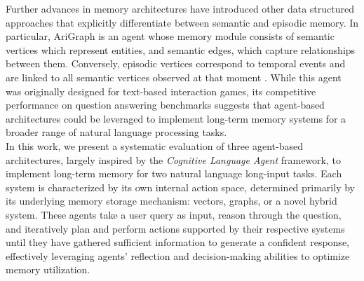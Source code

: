 \noindent Further advances in memory architectures have introduced other data structured approaches that explicitly differentiate between semantic and episodic memory. In particular, AriGraph is an agent whose memory module consists of semantic vertices which represent entities, and semantic edges, which capture relationships between them. Conversely, episodic vertices correspond to temporal events and are linked to all semantic vertices observed at that moment \cite{anokhin2024arigraphlearningknowledgegraph}. While this agent was originally designed for text-based interaction games, its competitive performance on question answering benchmarks suggests that agent-based architectures could be leveraged to implement long-term memory systems for a broader range of natural language processing tasks. \\

\noindent In this work, we present a systematic evaluation of three agent-based architectures, largely inspired by the \textit{Cognitive Language Agent} framework, to implement long-term memory for two natural language long-input tasks. Each system is characterized by its own internal action space, determined primarily by its underlying memory storage mechanism: vectors, graphs, or a novel hybrid system. These agents take a user query as input, reason through the question, and iteratively plan and perform actions supported by their respective systems until they have gathered sufficient information to generate a confident response, effectively leveraging agents' reflection and decision-making abilities to optimize memory utilization.\\




